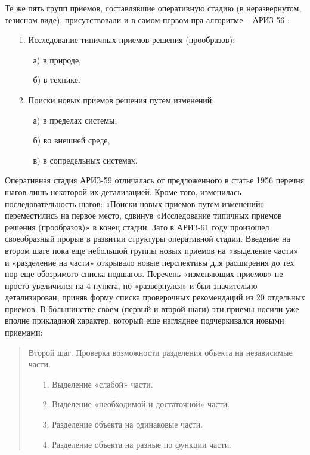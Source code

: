 \documentclass[11pt,a4paper]{article}
\begin{document}
Те же пять групп приемов, составлявшие оперативную стадию (в неразвернутом,
тезисном виде), присутствовали и в самом первом пра-алгоритме -- АРИЗ-56
\cite{Altshuller1956}:
\begin{itemize}
\item[1.] Исследование типичных приемов решения (прообразов):
  \begin{itemize}
  \item[а)] в природе,
  \item[б)] в технике.
  \end{itemize}
\item[2.] Поиски новых приемов решения путем изменений:
  \begin{itemize}
  \item[а)] в пределах системы,
  \item[б)] во внешней среде,
  \item[в)] в сопредельных системах.
  \end{itemize}
\end{itemize}
Оперативная стадия АРИЗ-59 отличалась от предложенного в статье 1956 перечня
шагов лишь некоторой их детализацией. Кроме того, изменилась
последовательность шагов: «Поиски новых приемов путем изменений» переместились
на первое место, сдвинув «Исследование типичных приемов решения (прообразов)»
в конец стадии. Зато в АРИЗ-61 году произошел своеобразный прорыв в развитии
структуры оперативной стадии. Введение на втором шаге пока еще небольшой
группы новых приемов на «выделение части» и «разделение на части» открывало
новые перспективы для расширения до тех пор еще обозримого списка подшагов.
Перечень «изменяющих приемов» не просто увеличился на 4 пункта, но
«развернулся» и был значительно детализирован, приняв форму списка проверочных
рекомендаций из 20 отдельных приемов. В большинстве своем (первый и второй
шаги) эти приемы носили уже вполне прикладной характер, который еще нагляднее
подчеркивался новыми приемами:
\begin{quote}
  Второй шаг. Проверка возможности разделения объекта на независимые части.
  \begin{itemize}
  \item[1.] Выделение «слабой» части.
  \item[2.] Выделение «необходимой и достаточной» части.
  \item[3.] Разделение объекта на одинаковые части.
  \item[4.] Разделение объекта на разные по функции части.
  \end{itemize}
\end{quote}
\end{document}

